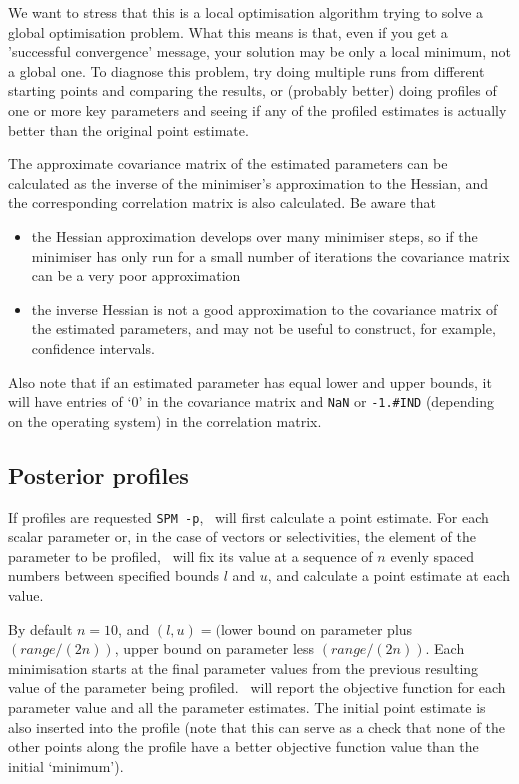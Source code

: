We want to stress that this is a local optimisation algorithm trying to solve a global optimisation problem. What this means is that, even if you get a 'successful convergence' message, your solution may be only a local minimum, not a global one. To diagnose this problem, try doing multiple runs from different starting points and comparing the results, or (probably better) doing profiles of one or more key parameters and seeing if any of the profiled estimates is actually better than the original point estimate.

The approximate covariance matrix of the estimated parameters can be calculated as the inverse of the minimiser's approximation to the Hessian, and the corresponding correlation matrix is also calculated. Be aware that

\begin{itemize}
\item the Hessian approximation develops over many minimiser steps, so if the minimiser has only run for a small number of iterations the covariance matrix can be a very poor approximation
\item the inverse Hessian is not a good approximation to the covariance matrix of the estimated parameters, and may not be useful to construct, for example, confidence intervals. 
\end{itemize}

Also note that if an estimated parameter has equal lower and upper bounds, it will have entries of `0' in the covariance matrix and \texttt{NaN} or \texttt{-1.\#IND} (depending on the operating system) in the correlation matrix. 

\subsection{Posterior profiles}

If profiles are requested \texttt{SPM -p}, \SPM\ will first calculate a point estimate. For each scalar parameter or, in the case of vectors or selectivities, the element of the parameter to be profiled, \SPM\ will fix its value at a sequence of $n$ evenly spaced numbers between specified bounds $l$ and $u$, and calculate a point estimate at each value. 

By default $n=10$, and $(l, u)=($lower bound on parameter plus $(range/(2n))$, upper bound on parameter less $(range/(2n))$. Each minimisation starts at the final parameter values from the previous resulting value of the parameter being profiled. \SPM\ will report the objective function for each parameter value and all the parameter estimates. The initial point estimate is also inserted into the profile (note that this can serve as a check that none of the other points along the profile have a better objective function value than the initial `minimum').

